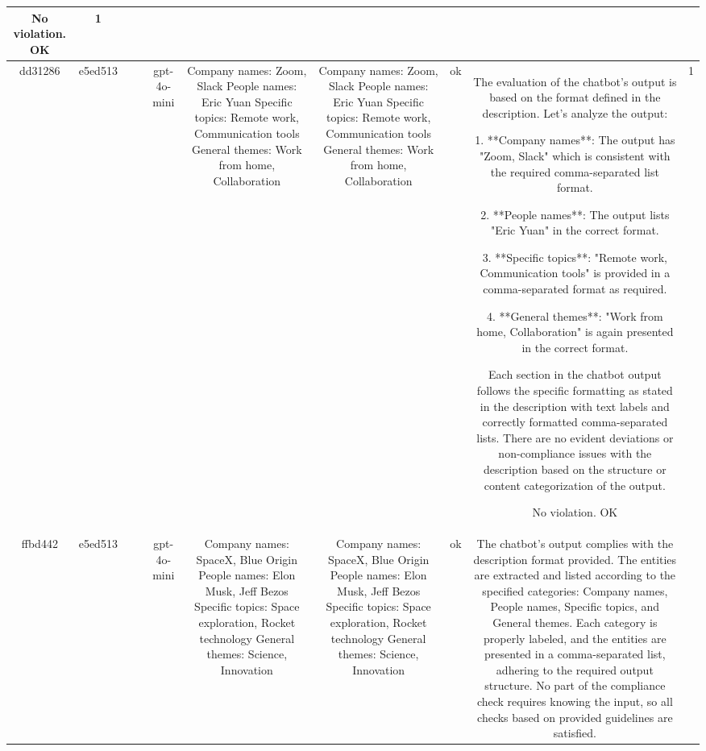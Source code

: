 \begin{table}[h!]
\begin{tabular}{|c|c|c|c|c|c|c|c|c|c|}
No violation.
OK & 1\\
\hline
dd31286 & e5ed513 &  &  & gpt-4o-mini & Company names: Zoom, Slack
People names: Eric Yuan
Specific topics: Remote work, Communication tools
General themes: Work from home, Collaboration & Company names: Zoom, Slack  
People names: Eric Yuan  
Specific topics: Remote work, Communication tools  
General themes: Work from home, Collaboration & ok & The evaluation of the chatbot's output is based on the format defined in the description. Let's analyze the output:

1. **Company names**: The output has "Zoom, Slack" which is consistent with the required comma-separated list format.

2. **People names**: The output lists "Eric Yuan" in the correct format.

3. **Specific topics**: "Remote work, Communication tools" is provided in a comma-separated format as required.

4. **General themes**: "Work from home, Collaboration" is again presented in the correct format.

Each section in the chatbot output follows the specific formatting as stated in the description with text labels and correctly formatted comma-separated lists. There are no evident deviations or non-compliance issues with the description based on the structure or content categorization of the output.

No violation.
OK & 1\\
\hline
ffbd442 & e5ed513 &  &  & gpt-4o-mini & Company names: SpaceX, Blue Origin
People names: Elon Musk, Jeff Bezos
Specific topics: Space exploration, Rocket technology
General themes: Science, Innovation & Company names: SpaceX, Blue Origin  
People names: Elon Musk, Jeff Bezos  
Specific topics: Space exploration, Rocket technology  
General themes: Science, Innovation   & ok & The chatbot's output complies with the description format provided. The entities are extracted and listed according to the specified categories: Company names, People names, Specific topics, and General themes. Each category is properly labeled, and the entities are presented in a comma-separated list, adhering to the required output structure. No part of the compliance check requires knowing the input, so all checks based on provided guidelines are satisfied.


\end{tabular}
\end{table}
